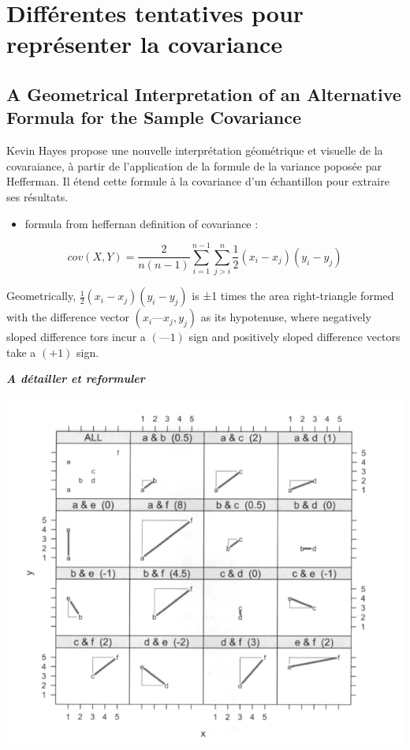 \documentclass[
]{report}
\providecommand{\tightlist}{%
  \setlength{\itemsep}{0pt}\setlength{\parskip}{0pt}}
\begin{document}
\hypertarget{diffuxe9rentes-tentatives-pour-repruxe9senter-la-covariance}{%
\section{Différentes tentatives pour représenter la covariance}\label{diffuxe9rentes-tentatives-pour-repruxe9senter-la-covariance}}

\hypertarget{a-geometrical-interpretation-of-an-alternative-formula-for-the-sample-covariance}{%
\subsection{A Geometrical Interpretation of an Alternative Formula for the Sample Covariance}\label{a-geometrical-interpretation-of-an-alternative-formula-for-the-sample-covariance}}

Kevin Hayes \citep{Hayes} propose une nouvelle interprétation géométrique et visuelle de la covaraiance, à partir de l'application de la formule de la variance poposée par Hefferman. Il étend cette formule à la covariance d'un échantillon pour extraire ses résultats.

\begin{itemize}
\tightlist
\item
  formula from heffernan definition of covariance :
\end{itemize}

\[cov(X,Y)= \frac{2}{n(n-1)}\sum_{i=1}^{n-1}\sum_{j>i}^{n}\frac{1}{2}(x_i-x_j)(y_i - y_j)\]

Geometrically, \(\frac{1}{2}(x_i-x_j)(y_i - y_j)\) is ±1 times the area right-triangle formed with the difference vector \((x_i — x_j, y_j)\) as its hypotenuse, where negatively sloped difference tors incur a \((—1)\) sign and positively sloped difference vectors take a \((+1)\) sign. \citep{Hayes}

\textbf{\emph{A détailler et reformuler}}

\includegraphics{hayes.PNG}
\end{document}

